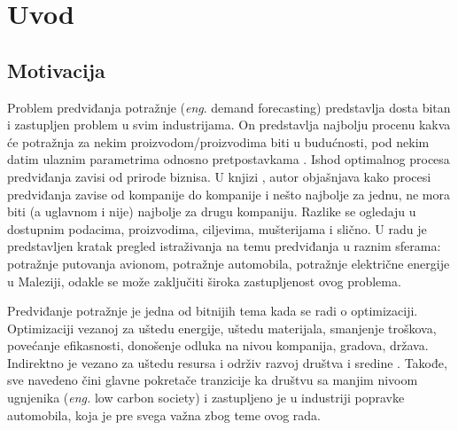 \documentclass[12pt,oneside]{memoir}
\begin{document}
\frontmatter
\naslovna
\komisija
\apstrakt
\tableofcontents*

\mainmatter

\chapter{Uvod}
\section{Motivacija}
Problem predviđanja potražnje (\textit{eng}. demand forecasting) predstavlja dosta bitan i zastupljen problem u svim industrijama. On predstavlja najbolju procenu kakva će potražnja za nekim proizvodom/proizvodima biti u budućnosti, pod nekim datim ulaznim parametrima odnosno pretpostavkama \cite{mello2013demand}. Ishod optimalnog procesa predviđanja zavisi od prirode biznisa. U knjizi \cite{mello2013demand}, autor objašnjava kako procesi predviđanja zavise od kompanije do kompanije i nešto najbolje za jednu, ne mora biti (a uglavnom i nije) najbolje za drugu kompaniju. Razlike se ogledaju u dostupnim podacima, proizvodima, ciljevima, mušterijama i slično. U radu \cite{zulkepli2015demand} je predstavljen kratak pregled istraživanja na temu predviđanja u raznim sferama: potražnje putovanja avionom, potražnje automobila, potražnje električne energije u Maleziji, odakle se može zaključiti široka zastupljenost ovog problema.

Predviđanje potražnje je jedna od bitnijih tema kada se radi o optimizaciji. Optimizaciji vezanoj za uštedu energije, uštedu materijala, smanjenje troškova, povećanje efikasnosti, donošenje odluka na nivou kompanija, gradova, država. Indirektno je vezano za uštedu resursa i održiv razvoj društva i sredine \cite{tratar2019forecasting}. Takođe, sve navedeno čini glavne pokretače tranzicije ka društvu sa manjim nivoom ugnjenika (\textit{eng.} low carbon society) \cite{eu2050} i zastupljeno je u industriji popravke automobila, koja je pre svega važna zbog teme ovog rada.
\end{document}
